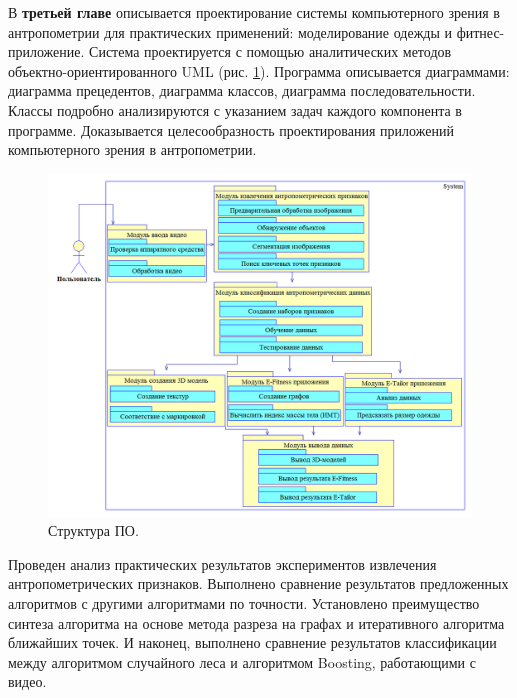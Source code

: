 В \textbf {третьей главе} описывается проектирование системы компьютерного зрения в антропометрии для практических применений: моделирование одежды и фитнес-приложение. Система проектируется с помощью аналитических методов объектно-ориентированного UML (рис. \ref{img35}). Программа описывается диаграммами: диаграмма прецедентов, диаграмма классов, диаграмма последовательности. Классы подробно анализируются с указанием задач каждого компонента в программе. Доказывается целесообразность проектирования приложений компьютерного зрения в антропометрии.
\begin{figure}[ht!]
\centering
\includegraphics [width=0.95\linewidth]{images/h35.png}
\begin{center}
\caption{Структура ПО.} \label{img35}
\end{center}
\end{figure}

Проведен анализ практических результатов экспериментов извлечения антропометрических признаков. Выполнено сравнение результатов предложенных алгоритмов с другими алгоритмами по точности. Установлено преимущество синтеза алгоритма на основе метода разреза на графах и итеративного алгоритма ближайших точек. И наконец, выполнено сравнение результатов классификации между алгоритмом случайного леса и алгоритмом Boosting, работающими с видео.

